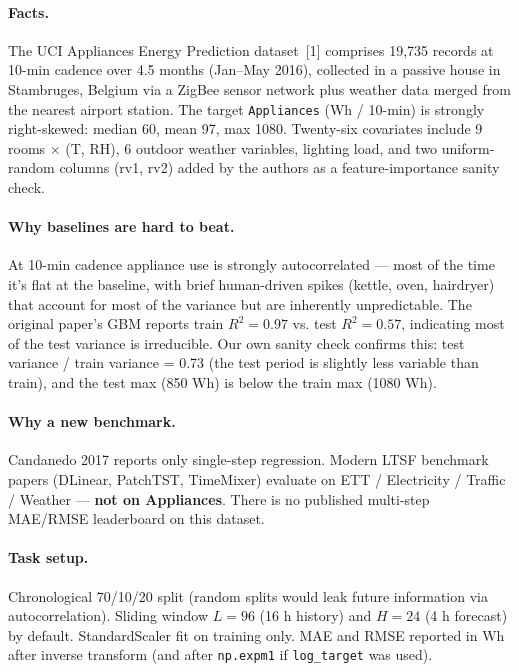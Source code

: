\documentclass[11pt,letterpaper]{article}
\begin{document}
\paragraph{Facts.} The UCI Appliances Energy Prediction dataset~[1] comprises
19{,}735 records at 10-min cadence over 4.5 months (Jan--May 2016),
collected in a passive house in Stambruges, Belgium via a ZigBee sensor
network plus weather data merged from the nearest airport station. The
target \texttt{Appliances} (Wh / 10-min) is strongly right-skewed: median
60, mean 97, max 1080. Twenty-six covariates include 9 rooms $\times$
(T, RH), 6 outdoor weather variables, lighting load, and two uniform-random
columns (rv1, rv2) added by the authors as a feature-importance sanity check.

\paragraph{Why baselines are hard to beat.} At 10-min cadence appliance use
is strongly autocorrelated --- most of the time it's flat at the baseline,
with brief human-driven spikes (kettle, oven, hairdryer) that account for
most of the variance but are inherently unpredictable. The original paper's
GBM reports train $R^2 = 0.97$ vs. test $R^2 = 0.57$, indicating most of the
test variance is irreducible. Our own sanity check confirms this: test
variance / train variance = 0.73 (the test period is slightly less variable
than train), and the test max (850 Wh) is below the train max (1080 Wh).

\paragraph{Why a new benchmark.} Candanedo 2017 reports only single-step
regression. Modern LTSF benchmark papers (DLinear, PatchTST, TimeMixer)
evaluate on ETT / Electricity / Traffic / Weather --- \textbf{not on
Appliances}. There is no published multi-step MAE/RMSE leaderboard on this
dataset.

\paragraph{Task setup.} Chronological 70/10/20 split (random splits would
leak future information via autocorrelation). Sliding window $L=96$ (16 h
history) and $H=24$ (4 h forecast) by default. StandardScaler fit on
training only. MAE and RMSE reported in Wh after inverse transform (and
after \texttt{np.expm1} if \texttt{log\_target} was used).
\end{document}

